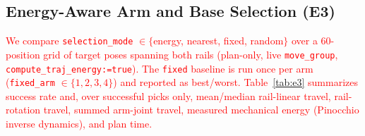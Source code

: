 \documentclass[conference]{IEEEtran}
\begin{document}

\subsection{Energy-Aware Arm and Base Selection (E3)}

\textcolor{red}{We compare \texttt{selection\_mode} $\in\{$energy, nearest, fixed,
random$\}$ over a 60-position grid of target poses spanning both rails
(plan-only, live \texttt{move\_group}, \texttt{compute\_traj\_energy:=true}). The
\texttt{fixed} baseline is run once per arm (\texttt{fixed\_arm} $\in\{1,2,3,4\}$)
and reported as best/worst. Table~\ref{tab:e3} summarizes success rate and, over
successful picks only, mean/median rail-linear travel, rail-rotation travel,
summed arm-joint travel, measured mechanical energy (Pinocchio inverse dynamics),
and plan time.}
\end{document}
